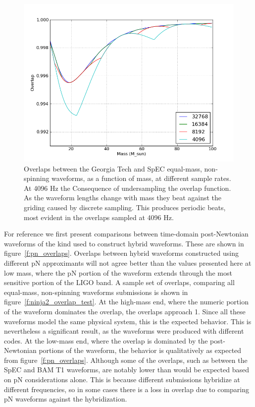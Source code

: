 \begin{figure}
  \includegraphics[width=\linewidth]{figures/ninja2/resolutions}
  \caption[Consequence of undersampling the overlap function]{
  \label{f:overlap_wiggles}
Overlaps between the Georgia Tech and SpEC equal-mass, non-spinning
waveforms, as a function of mass, at different sample rates.  At 4096
Hz the Consequence of undersampling the overlap function.  As the
waveform lengths change with mass they beat against the griding caused
by discrete sampling.  This produces periodic beats, most evident in
the overlaps sampled at 4096 Hz.}
\end{figure}%

For reference we first present comparisons between time-domain
post-Newtonian waveforms of the kind used to construct hybrid
waveforms.  These are shown in figure~\ref{f:pn_overlaps}.  Overlaps
between hybrid waveforms constructed using different pN approximants
will not agree better than the values presented here at low mass,
where the pN portion of the waveform extends through the most
sensitive portion of the LIGO band.  A sample set of overlaps,
comparing all equal-mass, non-spinning waveforms submissions is shown
in figure~\ref{f:ninja2_overlap_test}.  At the high-mass end, where
the numeric portion of the waveform dominates the overlap, the
overlaps approach 1.   Since all these waveforms model the same
physical system, this is the expected behavior.  This is nevertheless
a significant result, as the waveforms were produced with different
codes.  At the low-mass end, where the overlap is dominated by the
post-Newtonian portions of the waveform, the behavior is qualitatively
as expected from figure~\ref{f:pn_overlaps}.  Although some of the
overlaps, such as between the SpEC and BAM T1 waveforms, are notably
lower than would be expected based on pN considerations alone.  This
is because different submissions hybridize at different frequencies,
so in some cases there is a loss in overlap due to comparing pN
waveforms against the hybridization.

